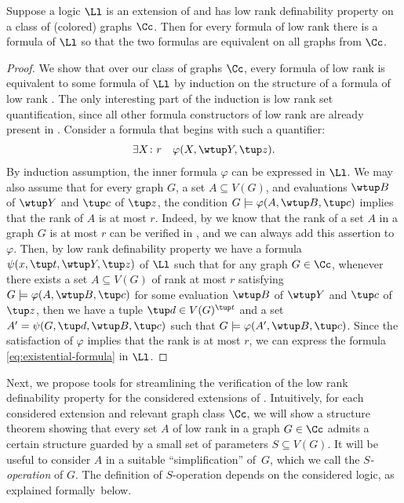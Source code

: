 \begin{theorem}
    \label{thm:low-rank-quantifier-elimination}
    Suppose a logic $\Ll$ is an extension of \fo and has low rank definability property on a class of (colored) graphs $\Cc$. Then for every formula of low rank \mso there is a formula of $\Ll$ so that the two formulas are equivalent on all graphs from $\Cc$.
\end{theorem}
\begin{proof}
    We show that over our class of graphs $\Cc$, every formula of low rank \mso is equivalent to some formula of $\Ll$ by induction on the structure of a formula of low rank \mso.
    The only interesting part of the induction is low rank set quantification, since all other formula constructors of low rank \mso are already present in \fo.
    Consider a formula that begins with such a quantifier:
    \begin{align}
    \label{eq:existential-formula}
    \exists X \colon r\quad \varphi(X, \wtup Y, \tup z).
    \end{align}
    By induction assumption, the inner formula $\varphi$ can be expressed in $\Ll$.
    We may also assume that for every graph $G$, a set $A \subseteq V(G)$, and evaluations $\wtup B$ of $\wtup Y$ and $\tup c$ of $\tup z$, the condition $G \models \varphi(A, \wtup B, \tup c)$ implies that the rank of $A$ is at most $r$.
    Indeed, by  we know that the rank of a set $A$ in a graph $G$ is at most $r$ can be verified in \fo, and we can always add this assertion to $\varphi$.
    Then, by low rank definability property we have a formula $\psi(x, \tup t, \wtup Y, \tup z)$ of $\Ll$ such that for any graph $G \in \Cc$, whenever there exists a set $A \subseteq V(G)$ of rank at most $r$ satisfying $G \models \varphi(A, \wtup B, \tup c)$ for some evaluation $\wtup B$ of $\wtup Y$ and $\tup c$ of $\tup z$, then we have a tuple $\tup d \in V(G)^{\tup t}$ and a set $A' = \psi(G, \tup d, \wtup B, \tup c)$ such that $G \models \varphi(A', \wtup B, \tup c)$.
    Since the satisfaction of $\varphi$ implies that the rank is at most $r$, we can express the formula \eqref{eq:existential-formula} in $\Ll$.
\end{proof}

Next, we propose tools for streamlining the verification of the low rank definability property for the considered extensions of \fo. Intuitively, for each considered extension and relevant graph class $\Cc$, we will show a structure theorem showing that every set $A$ of low rank in a graph $G\in \Cc$ admits a certain structure guarded by a small set of parameters $S\subseteq V(G)$. It will be useful to consider $A$ in a suitable ``simplification'' of~$G$, which we call the {\em{$S$-operation}} of $G$. The definition of $S$-operation depends on the considered logic, as explained formally~below.

